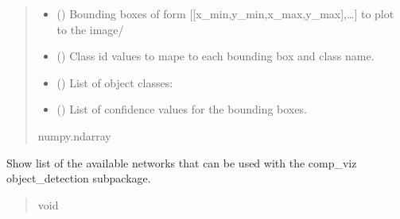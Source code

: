 \documentclass[letterpaper,10pt,english]{sphinxmanual}
\begin{document}
\begin{fulllineitems}
\begin{fulllineitems}
\begin{quote}
\begin{description}
\begin{itemize}
\item {} 
\sphinxAtStartPar
{} (\sphinxstyleliteralemphasis{\sphinxupquote{{[}}}\sphinxstyleliteralemphasis{\sphinxupquote{{]}}}) \textendash{} Bounding boxes of form {[}{[}x\_min,y\_min,x\_max,y\_max{]},…{]} to plot to the image/

\item {} 
\sphinxAtStartPar
{} (\sphinxstyleliteralemphasis{\sphinxupquote{{[}}}\sphinxstyleliteralemphasis{\sphinxupquote{{]}}}) \textendash{} Class id values to mape to each bounding box and class name.

\item {} 
\sphinxAtStartPar
{} (\sphinxstyleliteralemphasis{\sphinxupquote{{[}}}\sphinxstyleliteralemphasis{\sphinxupquote{{]}}}) \textendash{} List of object classes:

\item {} 
\sphinxAtStartPar
{} (\sphinxstyleliteralemphasis{\sphinxupquote{{[}}}\sphinxstyleliteralemphasis{\sphinxupquote{{]}}}) \textendash{} List of confidence values for the bounding boxes.

\end{itemize}

\sphinxAtStartPar
numpy.ndarray

\end{description}\end{quote}

\end{fulllineitems}


\begin{fulllineitems}
\label{\detokenize{comp_viz.utils:comp_viz.utils.toolbox.ObjectDetection.list_networks}}
\pysigstartsignatures
{}
\pysigstopsignatures
\sphinxAtStartPar
Show list of the available networks that can be used with the comp\_viz object\_detection sub\sphinxhyphen{}package.
\begin{quote}\begin{description}
\sphinxAtStartPar
void


\end{description}
\end{quote}
\end{fulllineitems}
\end{fulllineitems}
\end{document}

